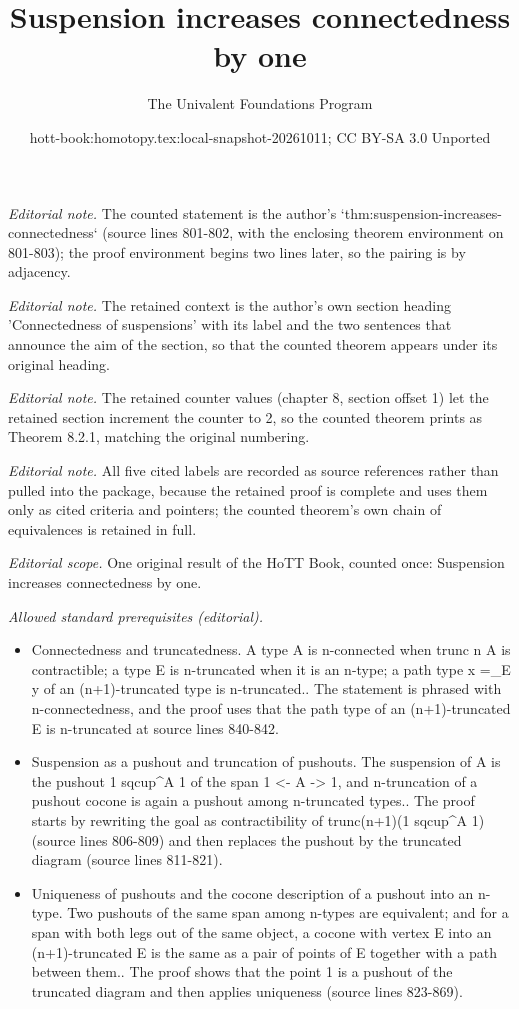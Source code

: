 \documentclass[10pt,a4paper]{article}
\title{Suspension increases connectedness by one}
\author{The Univalent Foundations Program}
\date{hott-book:homotopy.tex:local-snapshot-20261011; CC BY-SA 3.0 Unported}
\newcounter{chapter}
\theoremstyle{definition}
\theoremstyle{remark}
\numberwithin{equation}{section}
\begin{document}
\maketitle
\setcounter{chapter}{8}
\setcounter{section}{1}
\noindent\textit{Editorial note.} The counted statement is the author's `thm:suspension-increases-connectedness` (source lines 801-802, with the enclosing theorem environment on 801-803); the proof environment begins two lines later, so the pairing is by adjacency.\par\medskip
\noindent\textit{Editorial note.} The retained context is the author's own section heading 'Connectedness of suspensions' with its label and the two sentences that announce the aim of the section, so that the counted theorem appears under its original heading.\par\medskip
\noindent\textit{Editorial note.} The retained counter values (chapter 8, section offset 1) let the retained section increment the counter to 2, so the counted theorem prints as Theorem 8.2.1, matching the original numbering.\par\medskip
\noindent\textit{Editorial note.} All five cited labels are recorded as source references rather than pulled into the package, because the retained proof is complete and uses them only as cited criteria and pointers; the counted theorem's own chain of equivalences is retained in full.\par\medskip
\noindent\textit{Editorial scope.} One original result of the HoTT Book, counted once: Suspension increases connectedness by one.\par\medskip
\noindent\textit{Allowed standard prerequisites (editorial).}\begin{itemize}
\item Connectedness and truncatedness. A type A is n-connected when trunc n A is contractible; a type E is n-truncated when it is an n-type; a path type x =\_E y of an (n+1)-truncated type is n-truncated.. The statement is phrased with n-connectedness, and the proof uses that the path type of an (n+1)-truncated E is n-truncated at source lines 840-842.
\item Suspension as a pushout and truncation of pushouts. The suspension of A is the pushout 1 sqcup\textasciicircum{}A 1 of the span 1 <- A -> 1, and n-truncation of a pushout cocone is again a pushout among n-truncated types.. The proof starts by rewriting the goal as contractibility of trunc(n+1)(1 sqcup\textasciicircum{}A 1) (source lines 806-809) and then replaces the pushout by the truncated diagram (source lines 811-821).
\item Uniqueness of pushouts and the cocone description of a pushout into an n-type. Two pushouts of the same span among n-types are equivalent; and for a span with both legs out of the same object, a cocone with vertex E into an (n+1)-truncated E is the same as a pair of points of E together with a path between them.. The proof shows that the point 1 is a pushout of the truncated diagram and then applies uniqueness (source lines 823-869).
\end{itemize}\medskip
\end{document}
